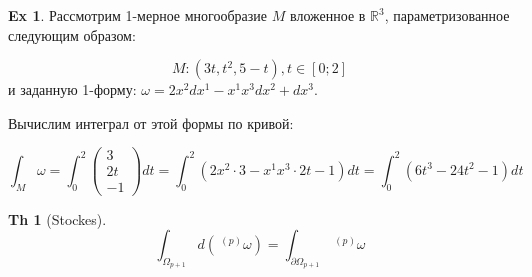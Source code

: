 \documentclass{article}
\theoremstyle{definition}
\newtheorem{example}{Ex}
\newtheorem{theorem}{Th}
\begin{document}
	
	\begin{example}Рассмотрим 1-мерное многообразие $M$ вложенное в $\mathbb{R}^3$, параметризованное следующим образом:

 $$M : (3t, t^2, 5-t), t \in [0;2]$$
и заданную 1-форму: $\omega = 2x^2 dx^1 - x^1 x^3 dx^2 + dx^3$.
	
	Вычислим интеграл от этой формы по кривой:
	
	\begin{equation*}
	\int_M \omega = \int_0^2 \begin{pmatrix} 3 \\ 2t \\ -1 \end{pmatrix} dt = \int_0^2 (2x^2\cdot 3 - x^1 x^3\cdot 2t - 1) dt = \int_0^2(6t^3-24t^2-1)dt
	\end{equation*}
\end{example}
\begin{theorem}[Stockes]
	\begin{equation}
	\int_{\Omega_{p+1}} d(\ ^{(p)} \omega) = \int_{\partial\Omega_{p+1}} \ ^{(p)}\omega
	\end{equation}
\end{theorem}
\end{document}
